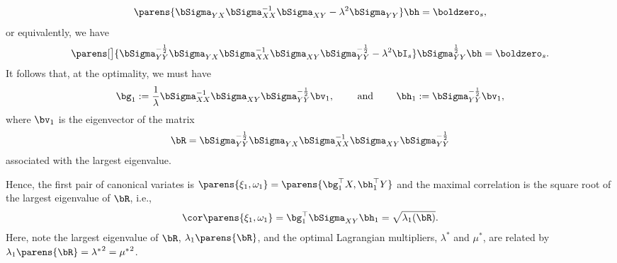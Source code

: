 \documentclass[12pt]{article}
\begin{document}
\begin{enumerate}[label=\textbf{\arabic*.}]
\begin{itemize}
\begin{align}
			\parens{\bSigma_{YX} \bSigma_{XX}^{-1} \bSigma_{XY} - \lambda^2 \bSigma_{YY}} \bh = \boldzero_s, 
		\end{align}
		or equivalently, we have 
		\begin{align}
			\parens[\big]{\bSigma_{YY}^{-\frac{1}{2}} \bSigma_{YX} \bSigma_{XX}^{-1} \bSigma_{XY} \bSigma_{YY}^{-\frac{1}{2}} - \lambda^2 \bI_s} \bSigma_{YY}^{\frac{1}{2}} \bh = \boldzero_s. 
		\end{align}
		It follows that, at the optimality, we must have 
		\begin{align}
			\bg_1 := \frac{1}{\lambda} \bSigma_{XX}^{-1} \bSigma_{XY} \bSigma_{YY}^{-\frac{1}{2}} \bv_1, \qquad \text{ and } \qquad \bh_1 := \bSigma_{YY}^{-\frac{1}{2}} \bv_1, 
		\end{align}
		where $\bv_1$ is the eigenvector of the matrix 
		\begin{align*}
			\bR = \bSigma_{YY}^{-\frac{1}{2}} \bSigma_{YX} \bSigma_{XX}^{-1} \bSigma_{XY} \bSigma_{YY}^{-\frac{1}{2}}
		\end{align*}
		associated with the largest eigenvalue. 
	\end{itemize}
	Hence, the first pair of canonical variates is $\parens{\xi_1, \omega_1} = \parens{\bg_1^\top X, \bh_1^\top Y}$ and the maximal correlation is the square root of the largest eigenvalue of $\bR$, i.e., 
	\begin{align}
		\cor \parens{\xi_1, \omega_1} = \bg_1^\top \bSigma_{XY} \bh_1 = \sqrt{\lambda_1 (\bR)}. 
	\end{align}
	Here, note the largest eigenvalue of $\bR$, $\lambda_1 \parens{\bR}$, and the optimal Lagrangian multipliers, $\lambda^*$ and $\mu^*$, are related by $\lambda_1 \parens{\bR} = {\lambda^*}^2 = {\mu^*}^2$. 
	

\end{enumerate}
\end{document}
